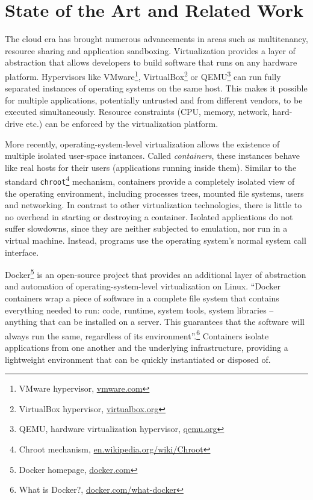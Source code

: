 \chapter{State of the Art and Related Work}
\label{chapter:sata-and-rw}

The cloud era has brought numerous advancements in areas such as multitenancy, resource sharing and application sandboxing. Virtualization provides a layer of abstraction that allows developers to build software that runs on any hardware platform. Hypervisors like VMware\footnote{VMware hypervisor, \url{vmware.com}}, VirtualBox\footnote{VirtualBox hypervisor, \url{virtualbox.org}} or QEMU\footnote{QEMU, hardware virtualization hypervisor, \url{qemu.org}} can run fully separated instances of operating systems on the same host. This makes it possible for multiple applications, potentially untrusted and from different vendors, to be executed simultaneously. Resource constraints (CPU, memory, network, hard-drive etc.) can be enforced by the virtualization platform.

More recently, operating-system-level virtualization allows the existence of multiple isolated user-space instances. Called \textit{containers}, these instances behave like real hosts for their users (applications running inside them). Similar to the standard \texttt{chroot}\footnote{Chroot mechanism, \url{en.wikipedia.org/wiki/Chroot}} mechanism, containers provide a completely isolated view of the operating environment, including processes trees, mounted file systems, users and networking. In contrast to other virtualization technologies, there is little to no overhead in starting or destroying a container. Isolated applications do not suffer slowdowns, since they are neither subjected to emulation, nor run in a virtual machine. Instead, programs use the operating system's normal system call interface.

Docker\footnote{Docker homepage, \url{docker.com}} is an open-source project that provides an additional layer of abstraction and automation of operating-system-level virtualization on Linux. ``Docker containers wrap a piece of software in a complete file system that contains everything needed to run: code, runtime, system tools, system libraries -- anything that can be installed on a server. This guarantees that the software will always run the same, regardless of its environment''.\footnote{What is Docker?, \url{docker.com/what-docker}} Containers isolate applications from one another and the underlying infrastructure, providing a lightweight environment that can be quickly instantiated or disposed of.

